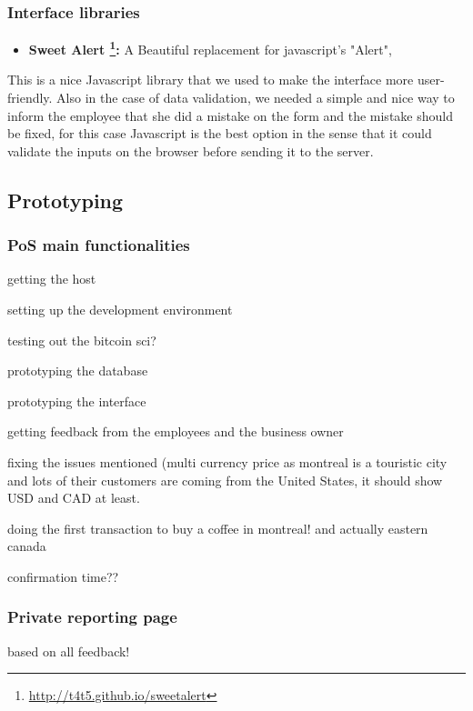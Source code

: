 \subsubsection{Interface libraries}
\begin{itemize}
\item \textbf{Sweet Alert \footnote{\url{http://t4t5.github.io/sweetalert}}: }  A Beautiful replacement for javascript's "Alert", 
\end{itemize}

This is a nice Javascript library that we used to make the interface more user-friendly. Also in the case of data validation, we needed a simple and nice way to inform the employee that she did a mistake on the form and the mistake should be fixed, for this case Javascript is the best option in the sense that it could validate the inputs on the browser before sending it to the server.


\subsection{Prototyping}



\subsubsection{PoS main functionalities}
getting the host

setting up the development environment

testing out the bitcoin sci?

prototyping the database

prototyping the interface

getting feedback from the employees and the business owner

fixing the issues mentioned (multi currency price as montreal is a touristic city and lots of their customers are coming from the United States, it should show USD and CAD at least.

doing the first transaction to buy a coffee in montreal! and actually eastern canada

confirmation time??


\subsubsection{Private reporting page}

based on all feedback!


